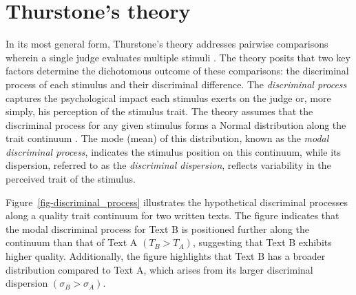\documentclass[
  authoryear,
  review,
  1p]{elsarticle}
\begin{document}
\section{Thurstone's theory}\label{sec-thurstone_theory}

In its most general form, Thurstone's theory addresses pairwise
comparisons wherein a single judge evaluates multiple stimuli
\citep[pp.~267]{Thurstone_1927b}. The theory posits that two key factors
determine the dichotomous outcome of these comparisons: the discriminal
process of each stimulus and their discriminal difference. The
\emph{discriminal process} captures the psychological impact each
stimulus exerts on the judge or, more simply, his perception of the
stimulus trait. The theory assumes that the discriminal process for any
given stimulus forms a Normal distribution along the trait continuum
\citep[pp.~266]{Thurstone_1927b}. The mode (mean) of this distribution,
known as the \emph{modal discriminal process}, indicates the stimulus
position on this continuum, while its dispersion, referred to as the
\emph{discriminal dispersion}, reflects variability in the perceived
trait of the stimulus.

Figure~\ref{fig-discriminal_process} illustrates the hypothetical
discriminal processes along a quality trait continuum for two written
texts. The figure indicates that the modal discriminal process for Text
B is positioned further along the continuum than that of Text A
\((T_{B} > T_{A})\), suggesting that Text B exhibits higher quality.
Additionally, the figure highlights that Text B has a broader
distribution compared to Text A, which arises from its larger
discriminal dispersion \((\sigma_{B} > \sigma_{A})\).
\end{document}
